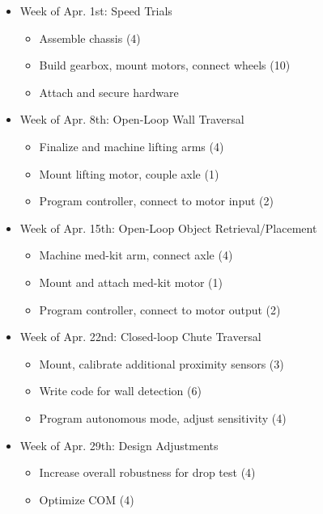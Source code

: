 \documentclass[12pt]{article}
\begin{document}
\begin{itemize}
\item Week of Apr. 1st: Speed Trials 
\begin{itemize}
\item Assemble chassis (4)
\item Build gearbox, mount motors, connect wheels (10)
\item Attach and secure hardware
\end{itemize} 
\end{itemize}
\begin{itemize}
\item Week of Apr. 8th: Open-Loop Wall Traversal  
\begin{itemize}
\item Finalize and machine lifting arms (4)
\item Mount lifting motor, couple axle (1)
\item Program controller, connect to motor input (2)
\end{itemize}
\end{itemize}
\begin{itemize}
\item Week of Apr. 15th: Open-Loop Object Retrieval/Placement  
\begin{itemize}
\item Machine med-kit arm, connect axle (4)
\item Mount and attach med-kit motor (1)
\item Program controller, connect to motor output (2)
\end{itemize}
\end{itemize}
\begin{itemize}
\item Week of Apr. 22nd: Closed-loop Chute Traversal  
\begin{itemize}
\item Mount, calibrate additional proximity sensors (3)
\item Write code for wall detection (6)
\item Program autonomous mode, adjust sensitivity (4)
\end{itemize}
\end{itemize}
\begin{itemize}
\item Week of Apr. 29th: Design Adjustments   
\begin{itemize}
\item Increase overall robustness for drop test (4)
\item Optimize COM (4)
\end{itemize}
\end{itemize}
\end{document}
